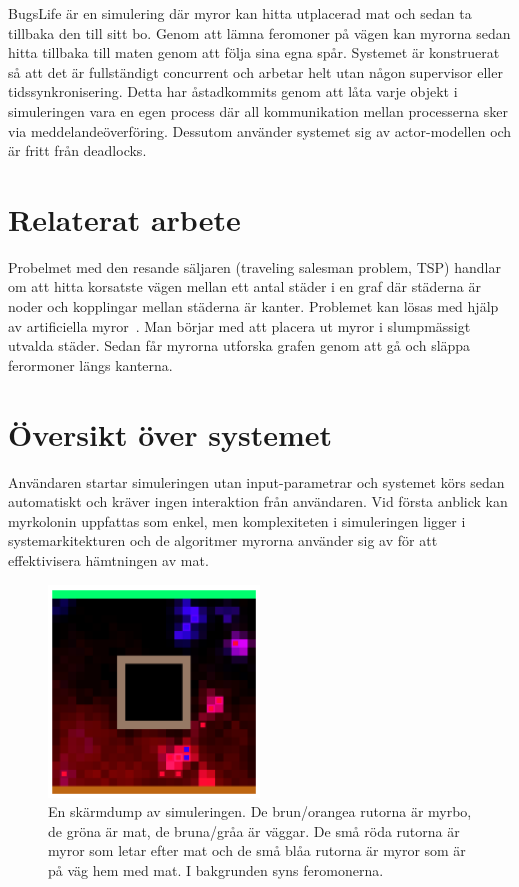 \documentclass[12pt]{article}
\begin{document}
BugsLife är en simulering där myror kan hitta utplacerad mat och sedan ta tillbaka den till sitt bo.
Genom att lämna feromoner på vägen kan myrorna sedan hitta tillbaka till maten genom att följa sina egna spår.
Systemet är konstruerat så att det är fullständigt concurrent och arbetar helt utan någon supervisor eller tidssynkronisering.
Detta har åstadkommits genom att låta varje objekt i simuleringen vara en egen process där all kommunikation mellan processerna sker via meddelandeöverföring.
Dessutom använder systemet sig av actor-modellen och är fritt från deadlocks.

\section{Relaterat arbete}
Probelmet med den resande säljaren (traveling salesman problem, TSP) handlar om att hitta korsatste vägen mellan ett antal städer i en graf där städerna är noder och kopplingar mellan städerna är kanter.
Problemet kan lösas med hjälp av artificiella myror~\cite{dorigo1997ant}.
Man börjar med att placera ut myror i slumpmässigt utvalda städer.
Sedan får myrorna utforska grafen genom att gå och släppa ferormoner längs kanterna.


\section{Översikt över systemet}
Användaren startar simuleringen utan input-parametrar och systemet körs sedan automatiskt och kräver ingen interaktion från användaren.
Vid första anblick kan myrkolonin uppfattas som enkel,
men komplexiteten i simuleringen ligger i systemarkitekturen och de algoritmer myrorna använder sig av för att effektivisera hämtningen av mat.

\begin{figure}[H]
    \centering
    \includegraphics[width=0.5\textwidth]{BugsLife-Fig1.png}
    \caption{
        En skärmdump av simuleringen.
        De brun/orangea rutorna är myrbo,
        de gröna är mat,
        de bruna/gråa är väggar.
        De små röda rutorna är myror som letar efter mat och de små blåa rutorna är myror som är på väg hem med mat.
        I bakgrunden syns feromonerna.
    }\label{fig:screen-dump}
\end{figure}
\end{document}
